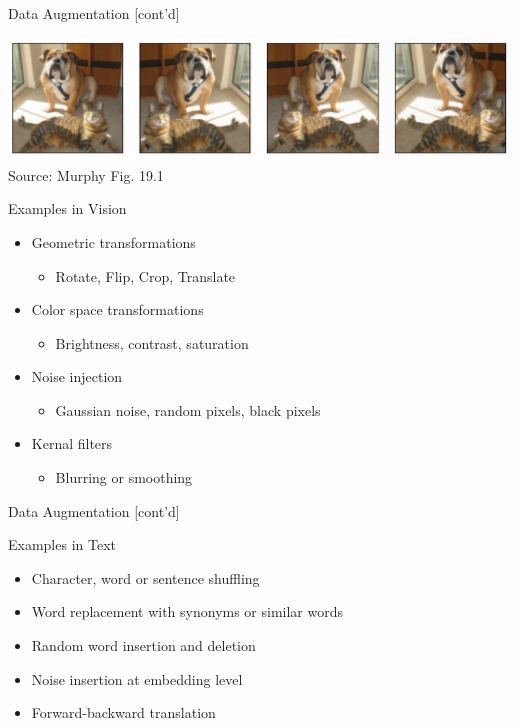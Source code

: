 \documentclass[ignorenonframetext,xcolor=x11names]{beamer}
\begin{document}
\begin{frame}{Data Augmentation \small [cont'd]}

\centering 

\includegraphics[width=\textwidth]{murphy_19_01.png} \\

\scriptsize Source: Murphy Fig. 19.1
\normalsize

\begin{block}{Examples in Vision}
\begin{itemize}
   \item Geometric transformations
   \begin{itemize}
      \item Rotate, Flip, Crop, Translate
   \end{itemize}
   \item Color space transformations
   \begin{itemize}
      \item Brightness, contrast, saturation
   \end{itemize}
   \item Noise injection
   \begin{itemize}
      \item Gaussian noise, random pixels, black pixels
   \end{itemize}
   \item Kernal filters
   \begin{itemize}
      \item Blurring or smoothing
   \end{itemize}
\end{itemize}
\end{block}
\end{frame}

\begin{frame}{Data Augmentation \small [cont'd]}

\begin{block}{Examples in Text}
\begin{itemize}
   \item Character, word or sentence shuffling
   \item Word replacement with synonyms or similar words
   \item Random word insertion and deletion
   \item Noise insertion at embedding level
   \item Forward-backward translation
\end{itemize}
\end{block}
\end{frame}
\end{document}
